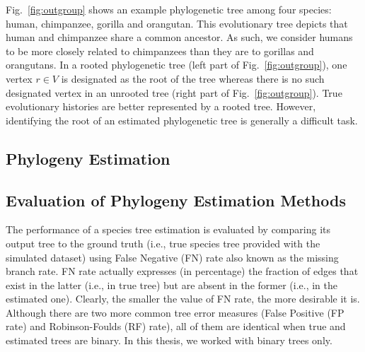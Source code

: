 Fig.~\ref{fig:outgroup} shows an example phylogenetic tree among four species: human, chimpanzee, gorilla and orangutan. This evolutionary tree depicts that human and chimpanzee share a common ancestor. As such, we consider humans to be more closely related to chimpanzees than they are to gorillas and orangutans.
In a rooted phylogenetic tree (left part of Fig.~\ref{fig:outgroup}), one vertex $r \in V$ is designated as the root of the tree whereas there is no such designated vertex in an unrooted tree (right part of Fig.~\ref{fig:outgroup}). True evolutionary histories are better represented by a rooted tree. However, identifying the root of an estimated phylogenetic tree is generally a difficult task.

\subsection{Phylogeny Estimation}

\subsection{Evaluation of Phylogeny Estimation Methods}\label{sec:phyPerf}
The performance of a species tree estimation is evaluated by comparing its output tree to the ground truth (i.e., true species tree provided with the simulated dataset) using False Negative (FN) rate also known as the missing branch rate. FN rate actually expresses (in percentage) the fraction of edges that exist in the latter (i.e., in true tree) but are absent in the former (i.e., in the estimated one). Clearly, the smaller the
value of FN rate, the more desirable it is. Although there are two more common tree error measures (False Positive (FP rate) and Robinson-Foulds (RF) rate), all of them are identical when true and estimated trees are binary. In this thesis, we worked with binary trees only.

